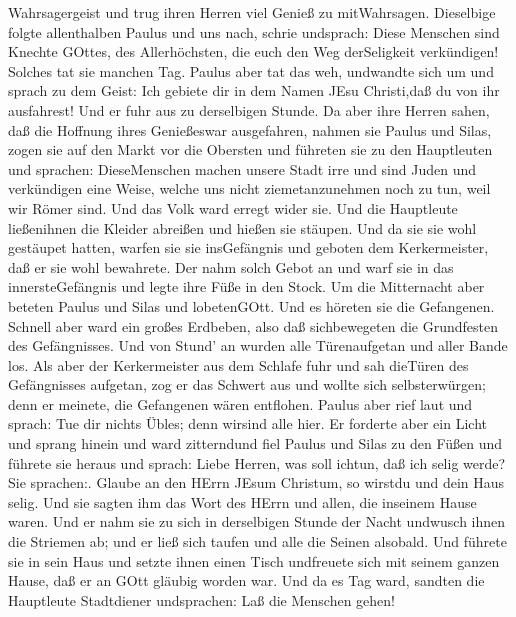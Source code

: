 Wahrsagergeist und trug ihren Herren viel Genieß zu mitWahrsagen.
 Dieselbige folgte allenthalben Paulus und uns nach, schrie
undsprach: Diese Menschen sind Knechte GOttes, des Allerhöchsten, die
euch den Weg derSeligkeit verkündigen!  Solches tat sie
manchen Tag. Paulus aber tat das weh, undwandte sich um und sprach zu
dem Geist: Ich gebiete dir in dem Namen JEsu Christi,daß du von ihr
ausfahrest! Und er fuhr aus zu derselbigen Stunde.  Da aber
ihre Herren sahen, daß die Hoffnung ihres Genießeswar ausgefahren,
nahmen sie Paulus und Silas, zogen sie auf den Markt vor die Obersten
 und führeten sie zu den Hauptleuten und sprachen:
DieseMenschen machen unsere Stadt irre und sind Juden  und
verkündigen eine Weise, welche uns nicht ziemetanzunehmen noch zu tun,
weil wir Römer sind.  Und das Volk ward erregt wider sie.
Und die Hauptleute ließenihnen die Kleider abreißen und hießen sie
stäupen.  Und da sie sie wohl gestäupet hatten, warfen sie
sie insGefängnis und geboten dem Kerkermeister, daß er sie wohl
bewahrete.  Der nahm solch Gebot an und warf sie in das
innersteGefängnis und legte ihre Füße in den Stock.  Um die
Mitternacht aber beteten Paulus und Silas und lobetenGOtt. Und es
höreten sie die Gefangenen.  Schnell aber ward ein großes
Erdbeben, also daß sichbewegeten die Grundfesten des Gefängnisses. Und
von Stund' an wurden alle Türenaufgetan und aller Bande los.
 Als aber der Kerkermeister aus dem Schlafe fuhr und sah
dieTüren des Gefängnisses aufgetan, zog er das Schwert aus und wollte
sich selbsterwürgen; denn er meinete, die Gefangenen wären entflohen.
 Paulus aber rief laut und sprach: Tue dir nichts Übles;
denn wirsind alle hier.  Er forderte aber ein Licht und
sprang hinein und ward zitterndund fiel Paulus und Silas zu den Füßen
 und führete sie heraus und sprach: Liebe Herren, was soll
ichtun, daß ich selig werde?  Sie sprachen:. Glaube an den
HErrn JEsum Christum, so wirstdu und dein Haus selig.  Und
sie sagten ihm das Wort des HErrn und allen, die inseinem Hause waren.
 Und er nahm sie zu sich in derselbigen Stunde der Nacht
undwusch ihnen die Striemen ab; und er ließ sich taufen und alle die
Seinen alsobald.  Und führete sie in sein Haus und setzte
ihnen einen Tisch undfreuete sich mit seinem ganzen Hause, daß er an
GOtt gläubig worden war.  Und da es Tag ward, sandten die
Hauptleute Stadtdiener undsprachen: Laß die Menschen gehen!
